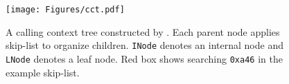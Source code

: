 



\begin{comment}

Thus, \tool{} first identifies the frames in the native 

To achieve this, 
\tool{} leverages the memory address range allocated for each 
{\tt \_PyEval\_EvalFrameDefault} to locate the {\tt PyFrame} objects' corresponding locations in the native call path by checking each level's instruction pointer. Then \tool fills the information of Python frames to the corresponding locations in the native call path, constructing a hybrid call path shown in Figure~\ref{fig:callpath}. Such a hybrid call path provides heuristic intuition for diagnosing Python applications.
\end{comment}



\begin{figure}[t]
	\centering
	\texttt{[image: Figures/cct.pdf]}
	\caption{A calling context tree constructed by \tool. Each parent node applies skip-list to organize children. {\tt INode} denotes an internal node and {\tt LNode} denotes a leaf node. Red box shows searching {\tt 0xa46} in the example skip-list.}
	\label{fig:cct}
\end{figure}




